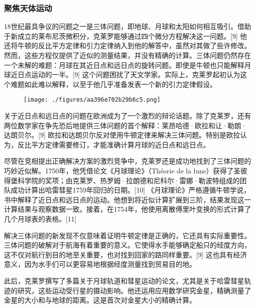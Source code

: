 \subsubsection{聚焦天体运动}  
18世纪最具争议的问题之一是三体问题，即地球、月球和太阳如何相互吸引。借助于新成立的莱布尼茨微积分，克莱罗能够通过四个微分方程解决这一问题。[9] 他还将牛顿的反比平方定律和引力定律纳入到他的解答中，虽然对其做了些许修改。然而，这些方程仅提供了近似的测量结果，并没有精确的计算。三体问题仍然存在一个未解的难题：月球在其近日点和远日点的旋转问题。即使是牛顿也只能解释月球近日点运动的一半。[9] 这个问题困扰了天文学家。实际上，克莱罗起初认为这个难题如此难以解释，以至于他几乎准备发表一个新的引力定律假设。
\begin{figure}[ht]
\centering
\texttt{[image: ./figures/aa396e702b29b6c5.png]}
\caption{} \label{fig_Alexis_3}
\end{figure}
关于近日点和远日点的问题在欧洲成为了一个激烈的辩论话题。除了克莱罗，还有两位数学家在争先恐后地提供三体问题的首个解释：莱昂哈德·欧拉和让·勒朗·达朗贝尔。[9] 欧拉和达朗贝尔反对使用牛顿定律来解决三体问题。特别是欧拉认为，反比平方定律需要修订，才能准确计算月球的近日点和远日点。

尽管在竞相提出正确解决方案的激烈竞争中，克莱罗还是成功地找到了三体问题的巧妙近似解。1750年，他凭借论文《月球理论》（Théorie de la lune）获得了圣彼得堡科学院的奖项；由克莱罗、热罗姆·拉朗德和尼科尔·雷娜·勒波特组成的团队成功计算出哈雷彗星1759年回归的日期。[10] 《月球理论》严格遵循牛顿学说，书中解释了近日点和远日点的运动。他想到将近似计算扩展到三阶，结果发现这一计算结果与观察数据一致。接着，在1754年，他使用离散傅里叶变换的形式计算了几个月球表的表格。[11]

解决三体问题的新发现不仅意味着证明牛顿定律是正确的，它还具有实际重要性。三体问题的破解对于航海有着重要的意义。它使得水手能够确定船只的经度方向，这不仅对航行到目的地至关重要，也对找到回家的路同样重要。[9] 这也具有经济意义，因为水手们可以更容易地根据经度测量找到贸易目的地。

此后，克莱罗撰写了多篇关于月球轨道和彗星运动的论文，尤其是关于哈雷彗星轨迹的研究，这些运动受行星的摄动影响。他还运用应用数学研究金星，精确测量了金星的大小和与地球的距离。这是首次对金星大小的精确计算。
